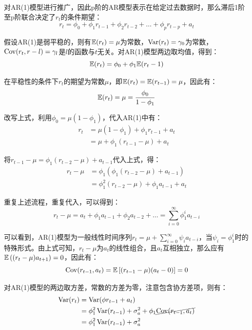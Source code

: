 \documentclass[11pt]{article}
\begin{document}
对AR(1)模型进行推广，因此p阶的AR模型表示在给定过去数据时，那么滞后1阶至p阶联合决定了$r_t$的条件期望：
\begin{equation*}
    r_t = \phi_0 + \phi_1 r_{t-1} +  \phi_2 r_{t-2} + \dots +  \phi_p r_{t-p}  + a_t
\end{equation*}

假设AR(1)是弱平稳的，则有$\mathbb{E}(r_t)=\mu$为常数，$\operatorname{Var}(r_t)=\gamma_0$为常数，$\operatorname{Cov}(r_t,r-l) = \gamma_l$是$l$的函数与$t$无关。对AR(1)模型两边取均值，得到：
\begin{equation*}
    \mathbb{E}(r_t) = \phi_0 + \phi_1 \mathbb{E}(r_t-1)
\end{equation*}

在平稳性的条件下$r_t$的期望为常数$\mu$，即$\mathbb{E}(r_t) = \mathbb{E}(r_{t-1}) = \mu$，因此有：
\begin{equation*}
    \mathbb{E}(r_t) = \mu = \frac{\phi_0}{1-\phi_1}
\end{equation*}

改写上式，利用$\phi_0 = \mu(1-\phi_1)$，代入AR(1)中有：
\begin{align*}
    r_t &= \mu(1-\phi_1) + \phi_1 r_{t-1} + a_t \\
    &= \mu + \phi_1 (r_{t-1}-\mu)+ a_t 
\end{align*}

将$r_{t-1} - \mu = \phi_1 (r_{t-2}-\mu)+ a_{t-1}$代入上式，得：
\begin{align*}
    r_t - \mu &= \phi_1 \left(\phi_1 (r_{t-2}-\mu)+ a_{t-1} \right) \\
    &= \phi_1^2 (r_{t-2}-\mu)+ \phi_1 a_{t-1} + a_t
\end{align*}

重复上述流程，重复代入，可以得到：
\begin{equation*}
    r_t - \mu = a_t + \phi_1 a_{t-1} + \phi_2 a_{t-2} + \dots = \sum_{i=0}^{\infty} \phi_{1}^{i} a_{t-i}
\end{equation*}

可以看到，AR(1)模型为一般线性时间序列$r_t = \mu + \sum_{i=0}^{\infty} \psi_i a_{t-i}$，当$\psi_i = \phi_{1}^{i}$时的特殊形式。由上式可知，$r_t-\mu$为$a_t$的线性组合，且$a_t$互相独立，那么应有$\mathbb{E}\left((r_{t}-\mu)a_{t+1}\right)=0$，因此有：
\begin{equation*}
    \operatorname{Cov}(r_{t-1},a_t) = \mathbb{E}\left[(r_{t-1} - \mu)(a_{t} - 0) \right] = 0
\end{equation*}

对AR(1)模型的两边取方差，常数的方差为零，注意包含协方差项，则有：
\begin{align*}
    \operatorname{Var}(r_t) &= \operatorname{Var}(\phi r_{t-1} + a_t) \\
    &= \phi_{1}^{2} \operatorname{Var}(r_{t-1}) + \sigma_{a}^{2} + \phi_1 \cancel{\operatorname{Cov} (r_{t-1},a_t)} \\
    &= \phi_{1}^{2} \operatorname{Var}(r_{t-1}) + \sigma_{a}^{2}
\end{align*}
\end{document}
